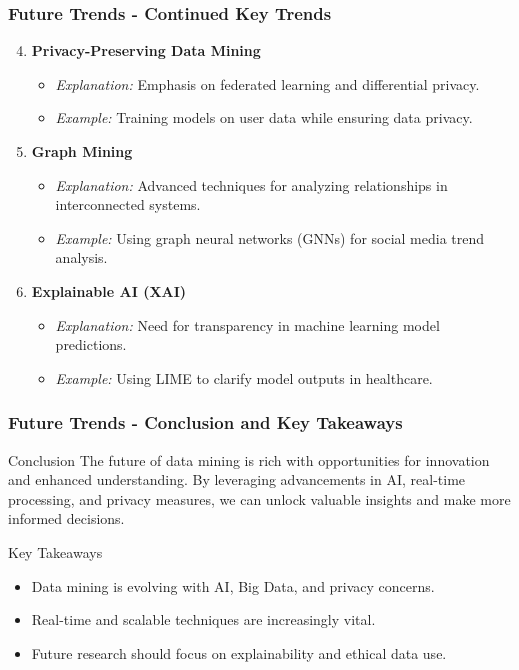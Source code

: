 \documentclass{beamer}
\begin{document}
\begin{frame}[fragile]
    \frametitle{Future Trends - Continued Key Trends}
    \begin{enumerate}
        \setcounter{enumi}{3} %
        \item \textbf{Privacy-Preserving Data Mining}
        \begin{itemize}
            \item \textit{Explanation:} Emphasis on federated learning and differential privacy.
            \item \textit{Example:} Training models on user data while ensuring data privacy.
        \end{itemize}

        \item \textbf{Graph Mining}
        \begin{itemize}
            \item \textit{Explanation:} Advanced techniques for analyzing relationships in interconnected systems.
            \item \textit{Example:} Using graph neural networks (GNNs) for social media trend analysis.
        \end{itemize}

        \item \textbf{Explainable AI (XAI)}
        \begin{itemize}
            \item \textit{Explanation:} Need for transparency in machine learning model predictions.
            \item \textit{Example:} Using LIME to clarify model outputs in healthcare.
        \end{itemize}
    \end{enumerate}
\end{frame}

\begin{frame}[fragile]
    \frametitle{Future Trends - Conclusion and Key Takeaways}
    \begin{block}{Conclusion}
        The future of data mining is rich with opportunities for innovation and enhanced understanding. By leveraging advancements in AI, real-time processing, and privacy measures, we can unlock valuable insights and make more informed decisions.
    \end{block}

    \begin{block}{Key Takeaways}
        \begin{itemize}
            \item Data mining is evolving with AI, Big Data, and privacy concerns.
            \item Real-time and scalable techniques are increasingly vital.
            \item Future research should focus on explainability and ethical data use.
        \end{itemize}
    \end{block}
\end{frame}
\end{document}
